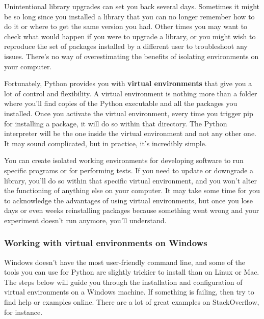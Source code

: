 Unintentional library upgrades can set you back several days. Sometimes it might be so long since you installed a library that you can no longer remember how to do it or where to get the same version you had. Other times you may want to check what would happen if you were to upgrade a library, or you might wish to reproduce the set of packages installed by a different user to troubleshoot any issues. There's no way of overestimating the benefits of isolating environments on your computer.

Fortunately, Python provides you with \textbf{virtual environments} that give you a lot of control and flexibility. A virtual environment is nothing more than a folder where you'll find copies of the Python executable and all the packages you installed. Once you activate the virtual environment, every time you trigger pip for installing a package, it will do so within that directory. The Python interpreter will be the one inside the virtual environment and not any other one. It may sound complicated, but in practice, it's incredibly simple.

You can create isolated working environments for developing software to run specific programs or for performing tests. If you need to update or downgrade a library, you'll do so within that specific virtual environment, and you won't alter the functioning of anything else on your computer. It may take some time for you to acknowledge the advantages of using virtual environments, but once you lose days or even weeks reinstalling packages because something went wrong and your experiment doesn't run anymore, you'll understand.


\subsubsection{Working with virtual environments on Windows}
Windows doesn't have the most user-friendly command line, and some of the tools you can use for Python are slightly trickier to install than on Linux or Mac. The steps below will guide you through the installation and configuration of virtual environments on a Windows machine. If something is failing, then try to find help or examples online. There are a lot of great examples on StackOverflow, for instance.

